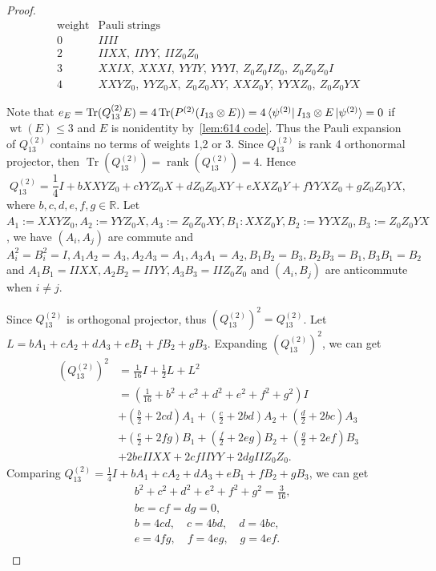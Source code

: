 \begin{proof}
    \begin{equation}
\begin{array}{c|l}
\text{weight} & \text{Pauli strings} \\ \hline
0 & IIII \\[2pt]
2 & IIXX,\ IIYY,\ IIZ_0Z_0 \\[2pt]
3 & XXIX,\ XXXI,\ YYIY,\ YYYI,\ Z_0Z_0IZ_0,\ Z_0Z_0Z_0I \\[2pt]
4 & XXYZ_0,\ YYZ_0X,\ Z_0Z_0XY,\ XXZ_0Y,\ YYXZ_0,\ Z_0Z_0YX
\end{array}
\end{equation}

Note that $e_E=\operatorname{Tr}(Q_{13}^{(2)}E)=4\operatorname{Tr}(P^{(2)}(I_{13}\otimes E))=4\bra{\psi^{(2)}}I_{13}\otimes E\ket{\psi^{(2)}}=0$ if $\operatorname{wt}(E)\leq 3$ and $E$ is nonidentity by~\cref{lem:614 code}. Thus the Pauli expansion of $Q_{13}^{(2)}$ contains no terms of weights 1,2 or 3. Since $Q_{13}^{(2)}$ is rank 4 orthonormal projector, then $\operatorname{Tr}(Q_{13}^{(2)})=\operatorname{rank}(Q_{13}^{(2)})=4$. Hence
\begin{equation}
    Q_{13}^{(2)}=\frac{1}{4}I+bXXYZ_0+cYYZ_0X+dZ_0Z_0XY+eXXZ_0Y+fYYXZ_0+gZ_0Z_0YX,
\end{equation}
where $b,c,d,e,f,g\in \mathbb{R}$. Let $A_1:=XXYZ_0,A_2:=YYZ_0X,A_3:=Z_0Z_0XY, B_1:XXZ_0Y,B_2:=YYXZ_0,B_3:=Z_0Z_0YX$, we have $(A_i,A_j)$ are commute and $A_i^2=B_i^2=I,A_1A_2=A_3,A_2A_3=A_1,A_3A_1=A_2,B_1B_2=B_3,B_2B_3=B_1,B_3B_1=B_2$ and $A_1B_1=IIXX,A_2B_2=IIYY,A_3B_3=IIZ_0Z_0$ and $(A_i,B_j)$ are anticommute when $i\neq j$.

Since $Q_{13}^{(2)}$ is orthogonal projector, thus $(Q_{13}^{(2)})^2=Q_{13}^{(2)}$. Let $L=bA_1+cA_2+dA_3+eB_1+fB_2+gB_3$. Expanding $(Q_{13}^{(2)})^2$, we can get
\begin{align}
    (Q_{13}^{(2)})^2&=\frac{1}{16}I+\frac{1}{2}L+L^2\\
    &=(\frac{1}{16}+b^2+c^2+d^2+e^2+f^2+g^2)I\\
    &+(\frac{b}{2}+2cd)A_1+(\frac{c}{2}+2bd)A_2+(\frac{d}{2}+2bc)A_3\\
    &+(\frac{e}{2}+2fg)B_1+(\frac{f}{2}+2eg)B_2+(\frac{g}{2}+2ef)B_3\\
    &+2beIIXX+2cfIIYY+2dgIIZ_0Z_0.
\end{align}
Comparing $Q_{13}^{(2)}=\frac{1}{4}I+bA_1+cA_2+dA_3+eB_1+fB_2+gB_3$, we can get
\begin{align}
    & b^2+c^2+d^2+e^2+f^2+g^2=\frac{3}{16},\\
    & be=cf=dg=0,\\
    & b=4cd,\quad c=4bd,\quad d=4bc,\\
    &e=4fg,\quad f=4eg,\quad g=4ef.\\
\end{align}


\end{proof}

